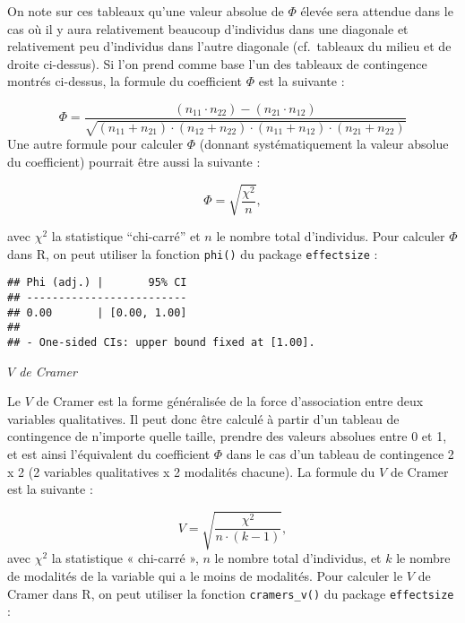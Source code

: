 \documentclass[
]{book}
\newenvironment{Shaded}{\begin{snugshade}}{\end{snugshade}}
\newcommand{\FunctionTok}[1]{\textcolor[rgb]{0.00,0.00,0.00}{#1}}
\newcommand{\NormalTok}[1]{#1}
\newcommand{\OtherTok}[1]{\textcolor[rgb]{0.56,0.35,0.01}{#1}}
\newcommand{\SpecialCharTok}[1]{\textcolor[rgb]{0.00,0.00,0.00}{#1}}
\begin{document}
On note sur ces tableaux qu'une valeur absolue de \(\Phi\) élevée sera attendue dans le cas où il y aura relativement beaucoup d'individus dans une diagonale et relativement peu d'individus dans l'autre diagonale (cf.~tableaux du milieu et de droite ci-dessus). Si l'on prend comme base l'un des tableaux de contingence montrés ci-dessus, la formule du coefficient \(\Phi\) est la suivante \autocite{janeEffectSizesConfidence2023} :

\[\Phi = \frac{(n_{11} \cdot n_{22}) - (n_{21} \cdot n_{12})}{\sqrt{(n_{11} + n_{21}) \cdot (n_{12} + n_{22}) \cdot (n_{11} + n_{12}) \cdot (n_{21} + n_{22})}}\]
Une autre formule pour calculer \(\Phi\) (donnant systématiquement la valeur absolue du coefficient) pourrait être aussi la suivante \autocite{janeEffectSizesConfidence2023} :

\[\Phi = \sqrt{\frac{\chi^2}{n}},\]

avec \(\chi^2\) la statistique ``chi-carré'' et \(n\) le nombre total d'individus. Pour calculer \(\Phi\) dans R, on peut utiliser la fonction \texttt{phi()} du package \texttt{effectsize} :

\begin{Shaded}
\end{Shaded}

\begin{verbatim}
## Phi (adj.) |       95% CI
## -------------------------
## 0.00       | [0.00, 1.00]
## 
## - One-sided CIs: upper bound fixed at [1.00].
\end{verbatim}

\emph{\(V\) de Cramer}

Le \(V\) de Cramer est la forme généralisée de la force d'association entre deux variables qualitatives. Il peut donc être calculé à partir d'un tableau de contingence de n'importe quelle taille, prendre des valeurs absolues entre 0 et 1, et est ainsi l'équivalent du coefficient \(\Phi\) dans le cas d'un tableau de contingence 2 x 2 (2 variables qualitatives x 2 modalités chacune). La formule du \(V\) de Cramer est la suivante \autocite{janeEffectSizesConfidence2023} :

\[V = \sqrt{\frac{\chi^2}{n \cdot (k-1)}},\]
avec \(\chi^2\) la statistique « chi-carré », \(n\) le nombre total d'individus, et \(k\) le nombre de modalités de la variable qui a le moins de modalités. Pour calculer le \(V\) de Cramer dans R, on peut utiliser la fonction \texttt{cramers\_v()} du package \texttt{effectsize} :
\end{document}
